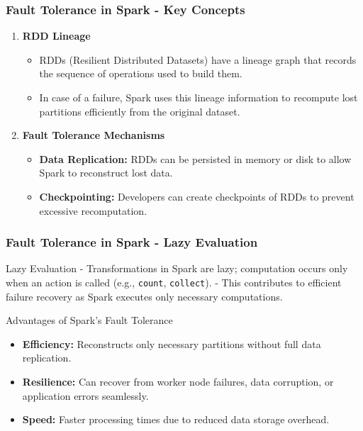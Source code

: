 \documentclass[aspectratio=169]{beamer}
\begin{document}
\begin{frame}[fragile]
    \frametitle{Fault Tolerance in Spark - Key Concepts}
    \begin{enumerate}
        \item \textbf{RDD Lineage}
        \begin{itemize}
            \item RDDs (Resilient Distributed Datasets) have a lineage graph that records 
            the sequence of operations used to build them.
            \item In case of a failure, Spark uses this lineage information to recompute lost 
            partitions efficiently from the original dataset.
        \end{itemize}
        \item \textbf{Fault Tolerance Mechanisms}
        \begin{itemize}
            \item \textbf{Data Replication:} RDDs can be persisted in memory or disk to allow Spark to 
            reconstruct lost data.
            \item \textbf{Checkpointing:} Developers can create checkpoints of RDDs to prevent excessive recomputation.
        \end{itemize}
    \end{enumerate}
\end{frame}

\begin{frame}[fragile]
    \frametitle{Fault Tolerance in Spark - Lazy Evaluation}
    \begin{block}{Lazy Evaluation}
        - Transformations in Spark are lazy; computation occurs only when an action is called (e.g., \texttt{count}, \texttt{collect}).
        - This contributes to efficient failure recovery as Spark executes only necessary computations.
    \end{block}
    
    \begin{block}{Advantages of Spark's Fault Tolerance}
        \begin{itemize}
            \item \textbf{Efficiency:} Reconstructs only necessary partitions without full data replication.
            \item \textbf{Resilience:} Can recover from worker node failures, data corruption, or application errors seamlessly.
            \item \textbf{Speed:} Faster processing times due to reduced data storage overhead.
        \end{itemize}
    \end{block}
\end{frame}
\end{document}
